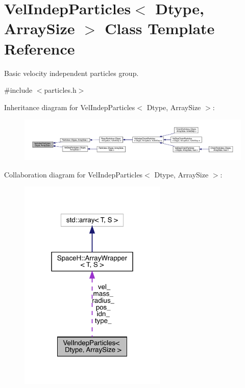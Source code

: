 \hypertarget{class_vel_indep_particles}{}\section{Vel\+Indep\+Particles$<$ Dtype, Array\+Size $>$ Class Template Reference}
\label{class_vel_indep_particles}


Basic velocity independent particles group.  




{\ttfamily \#include $<$particles.\+h$>$}



Inheritance diagram for Vel\+Indep\+Particles$<$ Dtype, Array\+Size $>$\+:
\nopagebreak
\begin{figure}[H]
\begin{center}
\leavevmode
\includegraphics[width=350pt]{class_vel_indep_particles__inherit__graph}
\end{center}
\end{figure}


Collaboration diagram for Vel\+Indep\+Particles$<$ Dtype, Array\+Size $>$\+:\nopagebreak
\begin{figure}[H]
\begin{center}
\leavevmode
\includegraphics[width=199pt]{class_vel_indep_particles__coll__graph}
\end{center}
\end{figure}
